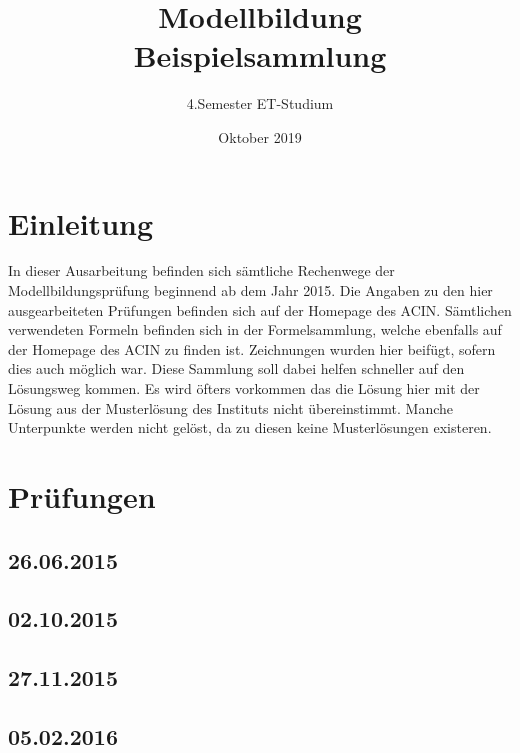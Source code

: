 \documentclass[a4paper,12p]{article}
\title{\huge Modellbildung\\\large \huge Beispielsammlung}
\author{\huge 4.Semester ET-Studium}
\date{\huge Oktober 2019}
\begin{document}
	\maketitle
	\newpage
	\tableofcontents
	\newpage
	
	\section{Einleitung}
	In dieser Ausarbeitung befinden sich sämtliche Rechenwege der Modellbildungsprüfung beginnend ab dem Jahr 2015. Die Angaben zu den hier ausgearbeiteten Prüfungen befinden sich auf der Homepage des ACIN. Sämtlichen verwendeten Formeln befinden sich in der Formelsammlung, welche ebenfalls auf der Homepage des ACIN zu finden ist. Zeichnungen wurden hier beifügt, sofern dies auch möglich war. Diese Sammlung soll dabei helfen schneller auf den Lösungsweg kommen. Es wird öfters vorkommen das die Lösung hier mit der Lösung aus der Musterlösung des Instituts nicht übereinstimmt. Manche Unterpunkte werden nicht gelöst, da zu diesen keine Musterlösungen existeren.
	
	\section{Prüfungen}
	
	\subsection{26.06.2015}
	
	
	
	
	
	\newpage
	\subsection{02.10.2015}
	
	
	
	
	
	\newpage
	\subsection{27.11.2015}
	
	
	
	
	\newpage
	\subsection{05.02.2016}
	
	
	
	
\end{document}
